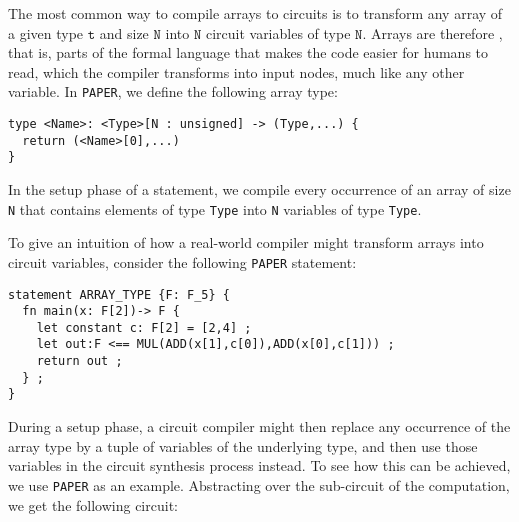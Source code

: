 The most common way to compile arrays to circuits is to transform any array of a given type $\texttt{t}$ and size $\texttt{N}$ into $\texttt{N}$ circuit variables of type $\texttt{N}$. Arrays are therefore , that is, parts of the formal language that makes the code easier for humans to read, which the compiler transforms into input nodes, much like any other variable. In \texttt{PAPER}, we define the following array type:
\begin{lstlisting}
type <Name>: <Type>[N : unsigned] -> (Type,...) { 
  return (<Name>[0],...)
}
\end{lstlisting}
In the setup phase of a statement, we compile every occurrence of an array of size \texttt{N} that contains elements of type \texttt{Type} into \texttt{N} variables of type \texttt{Type}.
\begin{example} To give an intuition of how a real-world compiler might transform arrays into circuit variables, consider the following \texttt{PAPER} statement:
\begin{lstlisting}
statement ARRAY_TYPE {F: F_5} {
  fn main(x: F[2])-> F {
  	let constant c: F[2] = [2,4] ;
  	let out:F <== MUL(ADD(x[1],c[0]),ADD(x[0],c[1])) ;
  	return out ;
  } ;
}
\end{lstlisting}
During a setup phase, a circuit compiler might then replace any occurrence of the array type by a tuple of variables of the underlying type, and then use those variables in the circuit synthesis process instead. To see how this can be achieved, we use \texttt{PAPER} as an example. Abstracting over the sub-circuit of the computation, we get the following circuit:
\begin{center}
\end{center}
\end{example}
